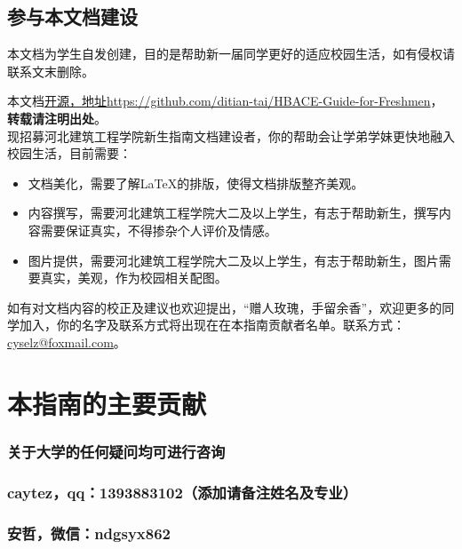 \documentclass[12pt]{article} %
\begin{document}
\subsection{参与本文档建设}

本文档为学生自发创建，目的是帮助新一届同学更好的适应校园生活，如有侵权请联系文末删除。

本文档\href{https://github.com/ditian-tai/HBACE-Guide-for-Freshmen}{开源，地址https://github.com/ditian-tai/HBACE-Guide-for-Freshmen}，\textbf{转载请注明出处}。\\

现招募河北建筑工程学院新生指南文档建设者，你的帮助会让学弟学妹更快地融入校园生活，目前需要：
\begin{itemize}
	\item 文档美化，需要了解\LaTeX 的排版，使得文档排版整齐美观。
	\item 内容撰写，需要河北建筑工程学院大二及以上学生，有志于帮助新生，撰写内容需要保证真实，不得掺杂个人评价及情感。
	\item 图片提供，需要河北建筑工程学院大二及以上学生，有志于帮助新生，图片需要真实，美观，作为校园相关配图。
\end{itemize}


如有对文档内容的校正及建议也欢迎提出，“赠人玫瑰，手留余香”，欢迎更多的同学加入，你的名字及联系方式将出现在在本指南贡献者名单。联系方式：\href{mailto:cyselz@foxmail.com}{cyselz@foxmail.com}。
			\newpage
\section{本指南的主要贡献} 
\subsubsection*{关于大学的任何疑问均可进行咨询}
\subsubsection*{caytez，qq：1393883102（添加请备注姓名及专业）}
\subsubsection*{安哲，微信：ndgsyx862}
\end{document}
